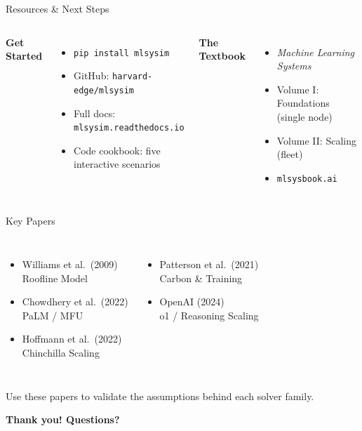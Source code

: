 \documentclass[aspectratio=169, 12pt]{beamer}
\begin{document}
\begin{frame}{Resources \& Next Steps}
\begin{columns}[T]
\textbf{Get Started}
\begin{itemize}
  \item \texttt{pip install mlsysim}
  \item GitHub: \texttt{harvard-edge/mlsysim}
  \item Full docs: \texttt{mlsysim.readthedocs.io}
  \item Code cookbook: five interactive scenarios
\end{itemize}

\textbf{The Textbook}
\begin{itemize}
  \item \emph{Machine Learning Systems}
  \item Volume I: Foundations (single node)
  \item Volume II: Scaling (fleet)
  \item \texttt{mlsysbook.ai}
\end{itemize}
\end{columns}
\end{frame}

\begin{frame}{Key Papers}
\begin{columns}[T]
\begin{itemize}
  \item Williams et al.\ (2009)\\
        {\footnotesize Roofline Model}
  \item Chowdhery et al.\ (2022)\\
        {\footnotesize PaLM / MFU}
  \item Hoffmann et al.\ (2022)\\
        {\footnotesize Chinchilla Scaling}
\end{itemize}

\begin{itemize}
  \item Patterson et al.\ (2021)\\
        {\footnotesize Carbon \& Training}
  \item OpenAI (2024)\\
        {\footnotesize o1 / Reasoning Scaling}
\end{itemize}
\end{columns}
\vfill
\begin{center}
\large Use these papers to validate the assumptions behind each solver family.
\end{center}
\end{frame}

\begin{frame}[c]{}
\centering
\Large\bfseries Thank you! Questions?
\end{frame}
\end{document}
